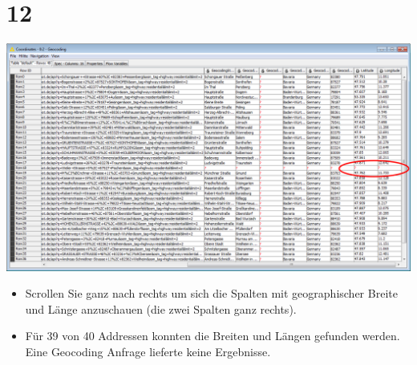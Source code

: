 \documentclass[10pt]{beamer}
\begin{document}
\section{12}
\begin{frame}
	\begin{center}
  		\includegraphics[height=0.6\textheight]{12.png}
	\end{center}
	\begin{itemize}
		\item Scrollen Sie ganz nach rechts um sich die Spalten mit geographischer Breite und Länge anzuschauen (die zwei Spalten ganz rechts).
		\item Für 39 von 40 Addressen konnten die Breiten und Längen gefunden werden. Eine Geocoding Anfrage lieferte keine Ergebnisse. 
	\end{itemize}
\end{frame}
\end{document}
